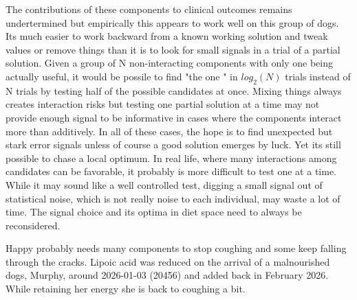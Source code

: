 The contributions of these components to clinical outcomes remains
undertermined but empirically this appears to work well on this group of
dogs. Its much easier to work backward from a known working solution
and tweak values or remove things than it is to look for small signals
in a trial of a partial solution. 
Given a group of N non-interacting components with only one
being actually useful, it would be possile to find 
"the one " in $log_2( N)$  trials instead
of N trials by testing half of the possible candidates at once. 
Mixing things always creates interaction risks
but testing one partial solution at a time may not provide enough
signal to be informative in cases where
the components interact more than additively. 
In all of these cases, the hope is to
find unexpected but stark error signals unless of course a 
good solution emerges by luck. 
Yet its still possible to chase a local optimum.
In real life, where many interactions among candidates can be favorable,
it probably is more difficult to test one at a time.
While it may sound like a well controlled test, digging a small signal
out of statistical noise, which is not really noise to each individual,
may waste a lot of time. 
The signal choice and its optima  in diet space need to always
be reconsidered. 

Happy probably needs many components to stop coughing and 
some keep falling through the cracks. Lipoic acid was reduced
on the arrival of a malnourished dogs, Murphy,  around
2026-01-03 (20456) and added back
in February 2026. While retaining her energy she is back to coughing
a bit. 



